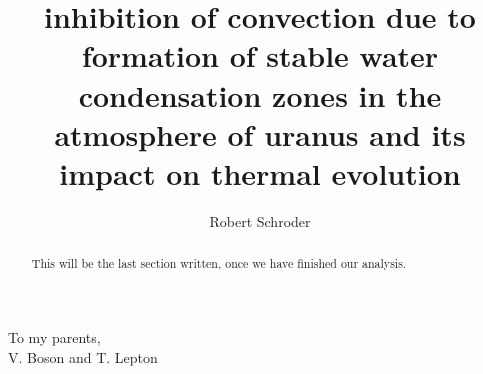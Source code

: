 \documentclass[11pt]{ucscthesisbs}
\begin{document}

\title{inhibition of convection due to formation of stable water condensation zones in the atmosphere of uranus and its impact on thermal evolution}
\author{Robert Schroder}
%
%



\maketitle
\copyrightpage

\begin{frontmatter}

\begin{abstract}
This will be the last section written, once we have finished our analysis.
\end{abstract}

\tableofcontents
%
%
\listoffigures
\listoftables

\begin{dedication}
\null\vfil
{\large
\begin{center}
To my parents,\\\vspace{12pt}
V. Boson and T. Lepton
\end{center}}
\vfil\null
\end{dedication}

\begin{acknowledgements}

\end{acknowledgements}


\end{frontmatter}

\end{document}
